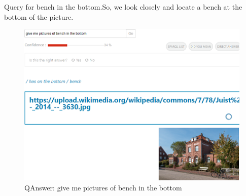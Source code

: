 \documentclass[12pt]{article}
\begin{document}
\newline
Query for bench in the bottom.So, we look closely and locate a bench at the bottom of the picture.
\begin{figure}[!h]
\center
\includegraphics{bottom.PNG}
\caption{QAnswer: give me pictures of bench  in the bottom}
\end{figure}

\newpage
\end{document}
